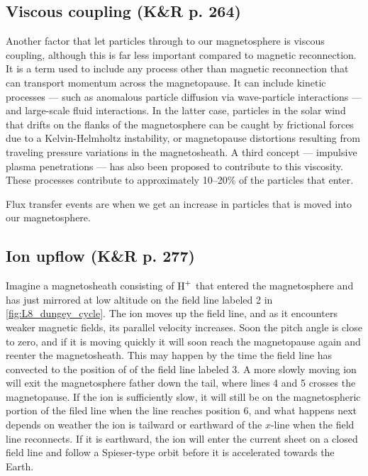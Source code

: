 \subsection[Viscous coupling]{Viscous coupling (K\&R p. 264)}
Another factor that let particles through to our magnetosphere is viscous coupling, although this is far less important compared to magnetic reconnection. It is a term used to include any process other than magnetic reconnection that can transport momentum across the magnetopause. It can include kinetic processes --- such as anomalous particle diffusion  via wave-particle interactions --- and large-scale fluid interactions. In the latter case, particles in the solar wind that drifts on the flanks of the magnetosphere can be caught by frictional forces due to a Kelvin-Helmholtz instability, or magnetopause distortions resulting from traveling pressure variations in the magnetosheath. A third concept --- impulsive plasma penetrations --- has also been proposed to contribute to this viscosity. These processes contribute to approximately 10--20\% of the particles that enter.

Flux transfer events are when we get an increase in particles that is moved into our magnetosphere.

\subsection[Ion upflow]{Ion upflow (K\&R p. 277)}
Imagine a magnetosheath consisting of \(\textnormal{H}^+\) that entered the magnetosphere and has just mirrored at low altitude on the field line labeled 2 in \cref{fig:L8_dungey_cycle}. The ion moves up the field line, and as it encounters weaker magnetic fields, its parallel velocity increases. Soon the pitch angle is close to zero, and if it is moving quickly it will soon reach the magnetopause again and reenter the magnetosheath. This may happen by the time the field line has convected to the position of of the field line labeled 3. A more slowly moving ion will exit the magnetosphere father down the tail, where lines 4 and 5 crosses the magnetopause. If the ion is sufficiently slow, it will still be on the magnetospheric portion of the filed line when the line reaches position 6, and what happens next depends on weather the ion is tailward or earthward of the \(x\)-line when the field line reconnects. If it is earthward, the ion will enter the current sheet on a closed field line and follow a Spieser-type orbit before it is accelerated towards the Earth.

